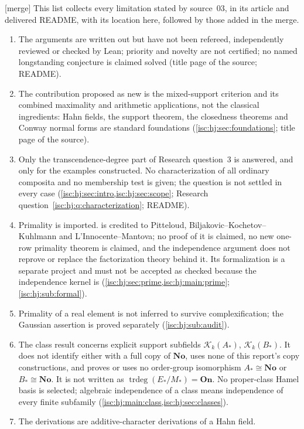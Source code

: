 \documentclass[11pt,letterpaper]{article}
\theoremstyle{definition}
\theoremstyle{remark}
\newcommand{\No}{\mathbf{No}}
\newcommand{\On}{\mathbf{On}}
\newcommand{\K}[2]{\mathcal K_{#1}(#2)}
\newcommand{\trdeg}{\operatorname{trdeg}}
\newcommand{\mtag}{\textup{[merge]}}%
\numberwithin{equation}{section}
\begin{document}
\mtag{} This list collects every limitation stated by source~03, in its
article and delivered README, with its location here, followed by those
added in the merge.
\begin{enumerate}[label=J\arabic*.,leftmargin=2.6em,itemsep=2pt]
\item The arguments are written out but have not been refereed,
independently reviewed or checked by Lean; priority and novelty are not
certified; no named longstanding conjecture is claimed solved (title page
of the source; README).
\item The contribution proposed as new is the mixed-support criterion and
its combined maximality and arithmetic applications, not the classical
ingredients: Hahn fields, the support theorem, the closedness theorems and
Conway normal forms are standard foundations
(\cref{isc:hj:sec:foundations}; title page of the source).
\item Only the transcendence-degree part of Research question~3 is
answered, and only for the examples constructed. No characterization of
all ordinary composita and no membership test is given; the question is not
settled in every case (\cref{isc:hj:sec:intro,isc:hj:sec:scope}; Research
question~\ref{isc:hj:q:characterization}; README).
\item Primality is imported.  is credited to
Pitteloud, Biljakovic--Kochetov--Kuhlmann and L'Innocente--Mantova; no
proof of it is claimed, no new one-row primality theorem is claimed, and
the independence argument does not reprove or replace the factorization
theory behind it. Its formalization is a separate project and must not be
accepted as checked because the independence kernel is
(\cref{isc:hj:sec:prime,isc:hj:main:prime}; \cref{isc:hj:sub:formal}).
\item Primality of a real element is not inferred to survive
complexification; the Gaussian assertion is proved separately
(\cref{isc:hj:sub:audit}).
\item The class result concerns explicit support subfields
$\K{k}{A_*}$, $\K{k}{B_*}$. It does not identify either with a full copy of
$\No$, uses none of this report's copy constructions, and proves or uses no
order-group isomorphism $A_*\cong\No$ or $B_*\cong\No$. It is not written as
$\trdeg(E_*/M_*)=\On$. No proper-class Hamel basis is selected; algebraic
independence of a class means independence of every finite subfamily
(\cref{isc:hj:main:class,isc:hj:sec:classes}).
\item The derivations are additive-character derivations of a Hahn field.

\end{enumerate}
\end{document}
